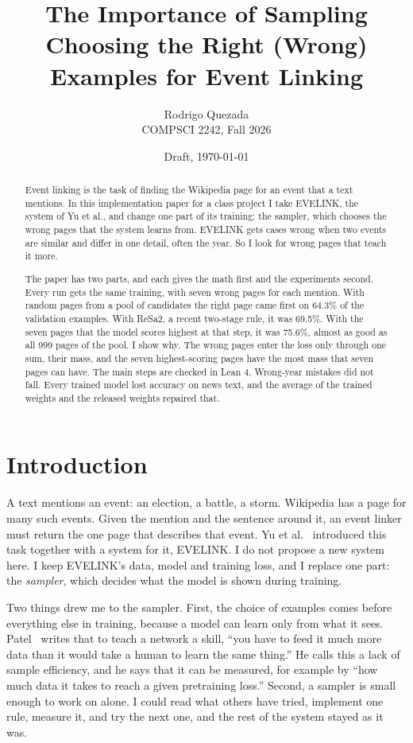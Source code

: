 \documentclass[11pt]{article}
\title{The Importance of Sampling\\
\large Choosing the Right (Wrong) Examples for Event Linking}
\author{Rodrigo Quezada\\ COMPSCI 2242, Fall 2026}
\date{Draft, \today}
\theoremstyle{definition}
\begin{document}
\maketitle

\begin{abstract}
Event linking is the task of finding the Wikipedia page for an event that a text mentions. In this implementation paper for a class project I take EVELINK, the system of Yu et al., and change one part of its training: the sampler, which chooses the wrong pages that the system learns from. EVELINK gets cases wrong when two events are similar and differ in one detail, often the year. So I look for wrong pages that teach it more.

The paper has two parts, and each gives the math first and the experiments second. Every run gets the same training, with seven wrong pages for each mention. With random pages from a pool of candidates the right page came first on 64.3\% of the validation examples. With ReSa2, a recent two-stage rule, it was 69.5\%. With the seven pages that the model scores highest at that step, it was 75.6\%, almost as good as all 999 pages of the pool. I show why. The wrong pages enter the loss only through one sum, their mass, and the seven highest-scoring pages have the most mass that seven pages can have. The main steps are checked in Lean 4. Wrong-year mistakes did not fall. Every trained model lost accuracy on news text, and the average of the trained weights and the released weights repaired that.
\end{abstract}

\section{Introduction}

A text mentions an event: an election, a battle, a storm. Wikipedia has a page for many such events. Given the mention and the sentence around it, an event linker must return the one page that describes that event. Yu et al.~\cite{yu2023event} introduced this task together with a system for it, EVELINK. I do not propose a new system here. I keep EVELINK's data, model and training loss, and I replace one part: the \emph{sampler}, which decides what the model is shown during training.

Two things drew me to the sampler. First, the choice of examples comes before everything else in training, because a model can learn only from what it sees. Patel~\cite{patel2026avalanche} writes that to teach a network a skill, ``you have to feed it much more data than it would take a human to learn the same thing.'' He calls this a lack of sample efficiency, and he says that it can be measured, for example by ``how much data it takes to reach a given pretraining loss.'' Second, a sampler is small enough to work on alone. I could read what others have tried, implement one rule, measure it, and try the next one, and the rest of the system stayed as it was.
\end{document}
